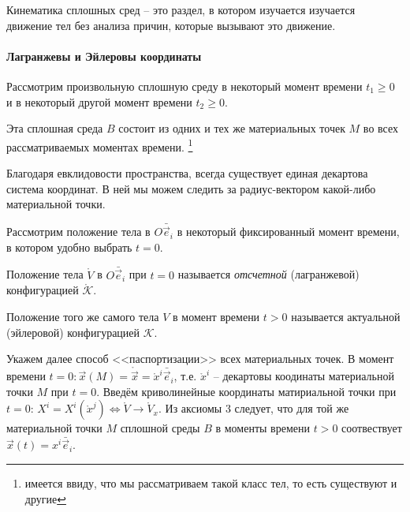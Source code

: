 \begin{definition}
  Кинематика сплошных сред -- это раздел, в котором изучается изучается движение тел без анализа
  причин, которые вызывают это движение.
\end{definition}

\paragraph{Лагранжевы и Эйлеровы координаты}

Рассмотрим произвольную сплошную среду в некоторый момент времени $t_1 \geqslant 0$ и в некоторый
другой момент времени $t_2 \geqslant 0$.

\begin{figure}[H]
	\centering
	
\end{figure}

Эта сплошная среда $B$ состоит из одних и тех же материальных точек $M$ во всех рассматриваемых 
моментах времени. \footnote{имеется ввиду, что мы рассматриваем такой класс тел, то есть существуют
и другие}
  
Благодаря евклидовости пространства, всегда существует единая декартова система координат. В
ней мы можем следить за радиус-вектором какой-либо материальной точки.

Рассмотрим положение тела в $O\bar{\vec{e}}_i$ в некоторый фиксированный момент времени, 
в котором удобно выбрать $t=0$.

\begin{figure}[H]
	\centering
	
\end{figure}

Положение тела $\mathring{V}$ в $O\bar{\vec{e}}_i$ при $t=0$ называется \emph{отсчетной}
(лагранжевой) конфигурацией $\mathring{\mathcal{K}}$.

Положение того же самого тела $V$ в момент времени $t > 0$ называется актуальной (эйлеровой)
конфигурацией $\mathcal{K}$.

Укажем далее способ <<паспортизации>> всех материальных точек. В момент времени $t = 0 :
\vec{x}(M) = \mathring{\vec{x}} = \mathring{x}^{i} \bar{\vec{e}}_i$, т.е. $\mathring{x}^{i}$
-- декартовы коодинаты материальной
точки $M$ при $t=0$. Введём криволинейные координаты матириальной точки при $t=0$:
$X^i = X^i(\mathring{x}^j) \Leftrightarrow \mathring{V} \to \mathring{V}_x$. Из аксиомы 3 следует, что для той же 
материальной точки $M$ сплошной среды $B$ в моменты времени $t > 0$ соотвествует $\vec{x}(t) = x^i \bar{\vec{e}}_i$.

